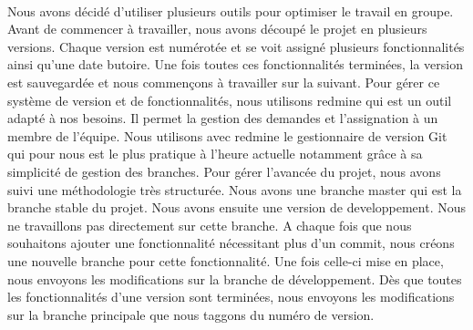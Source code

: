 \paragraph{}
Nous avons décidé d'utiliser plusieurs outils pour optimiser le travail en groupe. Avant de commencer à travailler, nous avons découpé le projet en plusieurs versions. Chaque version est numérotée et se voit assigné plusieurs fonctionnalités ainsi qu'une date butoire. Une fois toutes ces fonctionnalités terminées, la version est sauvegardée et nous commençons à travailler sur la suivant. Pour gérer ce système de version et de fonctionnalités, nous utilisons redmine qui est un outil adapté à nos besoins. Il permet la gestion des demandes et l'assignation à un membre de l'équipe. Nous utilisons avec redmine le gestionnaire de version Git qui pour nous est le plus pratique à l'heure actuelle notamment grâce à sa simplicité de gestion des branches. Pour gérer l'avancée du projet, nous avons suivi une méthodologie très structurée. Nous avons une branche master qui est la branche stable du projet. Nous avons ensuite une version de developpement. Nous ne travaillons pas directement sur cette branche. A chaque fois que nous souhaitons ajouter une fonctionnalité nécessitant plus d'un commit, nous créons une nouvelle branche pour cette fonctionnalité. Une fois celle-ci mise en place, nous envoyons les modifications sur la branche de développement. Dès que toutes les fonctionnalités d'une version sont terminées, nous envoyons les modifications sur la branche principale que nous taggons du numéro de version.
